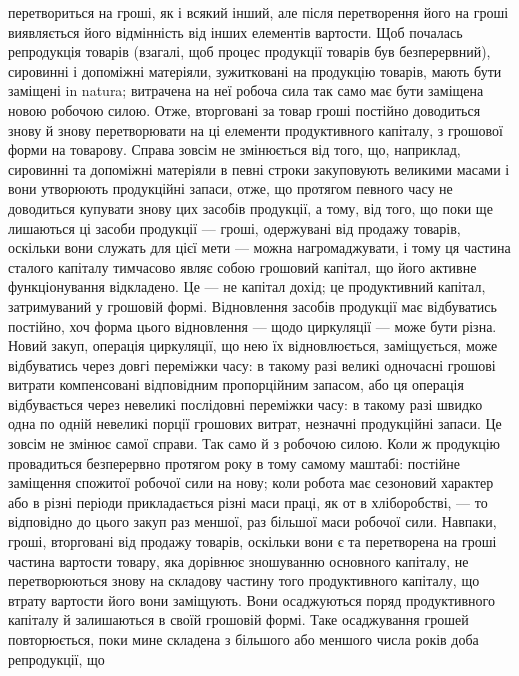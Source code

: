 \parcont{}  %
перетвориться на гроші, як і всякий інший, але після перетворення його
на гроші виявляється його відмінність від інших елементів вартости.
Щоб почалась репродукція товарів (взагалі, щоб процес продукції
товарів був безперервний), сировинні і допоміжні матеріяли, зужитковані на
продукцію товарів, мають бути заміщені in natura; витрачена на неї робоча
сила так само має бути заміщена новою робочою силою. Отже, вторговані
за товар гроші постійно доводиться знову й знову перетворювати на ці елементи
продуктивного капіталу, з грошової форми на товарову. Справа зовсім
не змінюється від того, що, наприклад, сировинні та допоміжні матеріяли
в певні строки закуповують великими масами і вони утворюють
продукційні запаси, отже, що протягом певного часу не доводиться купувати
знову цих засобів продукції, а тому, від того, що поки ще
лишаються ці засоби продукції — гроші, одержувані від продажу товарів,
оскільки вони служать для цієї мети — можна нагромаджувати, і тому
ця частина сталого капіталу тимчасово являє собою грошовий капітал,
що його активне функціонування відкладено. Це — не капітал \deq{} дохід; це
продуктивний капітал, затримуваний у грошовій формі. Відновлення засобів
продукції має відбуватись постійно, хоч форма цього відновлення
— щодо циркуляції — може бути різна. Новий закуп, операція циркуляції,
що нею їх відновлюється, заміщується, може відбуватись через довгі переміжки
часу: в такому разі великі одночасні грошові витрати компенсовані
відповідним пропорційним запасом, або ця операція відбувається через невеликі
послідовні переміжки часу: в такому разі швидко одна по одній невеликі
порції грошових витрат, незначні продукційні запаси. Це зовсім не
змінює самої справи. Так само й з робочою силою. Коли ж продукцію
провадиться безперервно протягом року в тому самому маштабі: постійне
заміщення спожитої робочої сили на нову; коли робота має сезоновий характер
або в різні періоди прикладається різні маси праці, як от в хліборобстві,
— то відповідно до цього закуп раз меншої, раз більшої маси робочої
сили. Навпаки, гроші, вторговані від продажу товарів, оскільки вони
є та перетворена на гроші частина вартости товару, яка дорівнює зношуванню
основного капіталу, не перетворюються знову на складову частину
того продуктивного капіталу, що втрату вартости його вони заміщують.
Вони осаджуються поряд продуктивного капіталу й залишаються в своїй
грошовій формі. Таке осаджування грошей повторюється, поки мине
складена з більшого або меншого числа років доба репродукції, що
